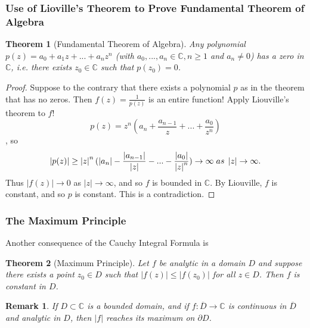 \documentclass{article}
\newtheorem{theorem}{Theorem}[section]
\newtheorem*{remark}{Remark}
\begin{document}
\subsubsection{Use of Lioville's Theorem to Prove Fundamental Theorem of Algebra}
\begin{theorem}[Fundamental Theorem of Algebra]
Any polynomial $p(z) = a_0 + a_1z + ... + a_nz^n$ (with $a_0,...,a_n \in \mathbb{C}, n \geq 1$ and $a_n \neq 0$) has a zero in $\mathbb{C}$, i.e. there exists $z_0 \in \mathbb{C}$ such that $p(z_0) = 0$.
\end{theorem}
\begin{proof}
Suppose to the contrary that there exists a polynomial $p$ as in the theorem that has no zeros. Then $f(z) = \frac{1}{p(z)}$ is an entire function! Apply Liouville's theorem to $f$!
\begin{equation*}
p(z) = z^n(a_n + \frac{a_{n-1}}{z} + ... + \frac{a_0}{z^n})
\end{equation*}
, so
\begin{equation*}
\left|p(z)\right| \geq \left|z\right|^n (\left|a_n\right| - \frac{\left|a_{n-1}\right|}{\left|z\right|} - ... - \frac{\left|a_0\right|}{\left|z\right|^n}) \to \infty \hspace{0.1cm} as \hspace{0.1cm} \left|z\right| \to \infty.
\end{equation*}
Thus $\left|f(z)\right| \to 0$ as $\left|z\right| \to \infty$, and so $f$ is bounded in $\mathbb{C}$. By Liouville, $f$ is constant, and so $p$ is constant. This is a contradiction.
\end{proof}

\subsubsection{The Maximum Principle}
Another consequence of the Cauchy Integral Formula is
\begin{theorem}[Maximum Principle]
Let $f$ be analytic in a domain $D$ and suppose there exists a point $z_0 \in D$ such that $\left|f(z)\right| \leq \left|f(z_0)\right|$ for all $z \in D$. Then $f$ is constant in $D$.
\end{theorem}
\begin{remark}
If $D \subset \mathbb{C}$ is a bounded domain, and if $f : \overline{D} \to \mathbb{C}$ is continuous in $\overline{D}$ and analytic in $D$, then $\left|f\right|$ reaches its maximum on $\partial D$.
\end{remark}
\end{document}
